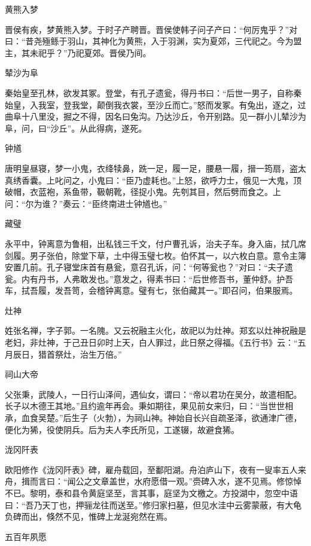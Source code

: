 \documentclass[a4paper,12pt,UTF8,twoside]{ctexbook}
\begin{document}
    黄熊入梦
    
    晋侯有疾，梦黄熊入梦。于时子产聘晋。晋侯使韩子问子产曰：“何厉鬼乎？”对曰：“昔尧殛鲧于羽山，其神化为黄熊，入于羽渊，实为夏郊，三代祀之。今为盟主，其未祀乎？”乃祀夏郊。晋侯乃间。
    
    辇沙为阜
    
    秦始皇至孔林，欲发其冢。登堂，有孔子遗瓮，得丹书曰：“后世一男子，自称秦始皇，入我室，登我堂，颠倒我衣裳，至沙丘而亡。”怒而发冢。有兔出，逐之，过曲阜十八里没，掘之不得，因名曰兔沟。乃达沙丘，令开别路。见一群小儿辇沙为阜，问，曰“沙丘”。从此得病，遂死。
    
    钟馗
    
    唐明皇昼寝，梦一小鬼，衣绛犊鼻，跣一足，履一足，腰悬一履，搢一筠扇，盗太真绣香囊。上叱问之，小鬼曰：“臣乃虚耗也。”上怒，欲呼力士，俄见一大鬼，顶破帽，衣蓝袍，系鱼带，靸朝靴，径捉小鬼。先刳其目，然后劈而食之。上问：“尔为谁？”奏云：“臣终南进士钟馗也。”
    
    藏璧
    
    永平中，钟离意为鲁相，出私钱三千文，付户曹孔诉，治夫子车。身入庙，拭几席剑履。男子张伯，除堂下草，土中得玉璧七枚。伯怀其一，以六枚白意。意令主簿安置几前。孔子寝堂床首有悬瓮，意召孔诉，问：“何等瓮也？”对曰：“夫子遗瓮。内有丹书，人弗敢发也。”意发之，得素书曰：“后世修吾书，董仲舒。护吾车，拭吾履，发吾笥，会稽钟离意。璧有七，张伯藏其一。”即召问，伯果服焉。
    
    灶神
    
    姓张名禅，字子郭。一名隗。又云祝融主火化，故祀以为灶神。郑玄以灶神祝融是老妇，非灶神，于己丑日卯时上天，白人罪过，此日祭之得福。《五行书》云：“五月辰日，猎首祭灶，治生万倍。”
    
    祠山大帝
    
    父张秉，武陵人，一日行山泽间，遇仙女，谓曰：“帝以君功在吴分，故遣相配。长子以木德王其地。”且约逾年再会。秉如期往，果见前女来归，曰：“当世世相承，血食吴楚。”后生子（火勃），为祠山神。神始自长兴自疏圣泽，欲通津广德，便化为狶，役使阴兵。后为夫人李氏所见，工遂辍，故避食狶。
    
    泷冈阡表
    
    欧阳修作《泷冈阡表》碑，雇舟载回，至鄱阳湖。舟泊庐山下，夜有一叟率五人来舟，揖而言曰：“闻公之文章盖世，水府愿借一观。”赍碑入水，遂不见焉。修惊悼不已。黎明，泰和县令黄庭坚至，言其事，庭坚为文檄之。方投湖中，忽空中语曰：“吾乃天丁也，押骊龙往而送至。”修归家扫墓，但见水洼中云雾蒙蔽，有大龟负碑而出，倏然不见，惟碑上龙涎宛然在焉。
    
    五百年夙愿
    
\end{document}
